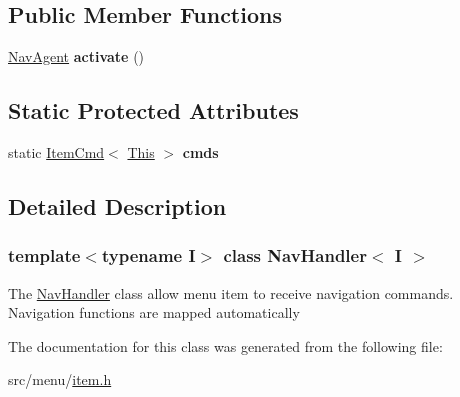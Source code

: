 \subsection*{Public Member Functions}
\begin{DoxyCompactItemize}
\item 
\mbox{\label{classNavHandler_aa3ca001d5ed2723e3b678388fc61ffe0}} 
\hyperlink{structNavAgent}{Nav\+Agent} {\bfseries activate} ()
\end{DoxyCompactItemize}
\subsection*{Static Protected Attributes}
\begin{DoxyCompactItemize}
\item 
\mbox{\label{classNavHandler_a01e40124246d78a0a84edef0e8a99f9f}} 
static \hyperlink{structItemCmd}{Item\+Cmd}$<$ \hyperlink{classNavHandler}{This} $>$ {\bfseries cmds}
\end{DoxyCompactItemize}


\subsection{Detailed Description}
\subsubsection*{template$<$typename I$>$\newline
class Nav\+Handler$<$ I $>$}

The \hyperlink{classNavHandler}{Nav\+Handler} class allow menu item to receive navigation commands. Navigation functions are mapped automatically 

The documentation for this class was generated from the following file\+:\begin{DoxyCompactItemize}
\item 
src/menu/\hyperlink{item_8h}{item.\+h}\end{DoxyCompactItemize}
